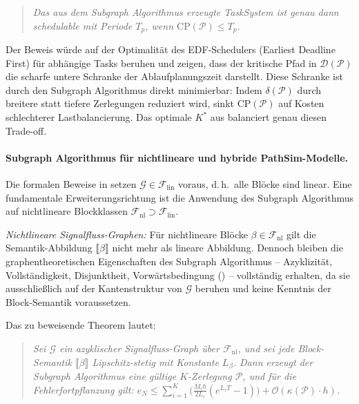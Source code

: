 ﻿\documentclass[12pt,a4paper]{article}
\theoremstyle{definition}
\begin{document}
\begin{quote}
\textit{Das aus dem Subgraph Algorithmus erzeugte TaskSystem ist genau
dann schedulable mit Periode $T_p$, wenn
$\mathrm{CP}(\mathcal{P}) \leq T_p$.}
\end{quote}

Der Beweis würde auf der Optimalität des EDF-Schedulers (Earliest
Deadline First) für abhängige Tasks beruhen und zeigen, dass der
kritische Pfad in $\mathcal{D}(\mathcal{P})$ die scharfe untere
Schranke der Ablaufplanungszeit darstellt. Diese Schranke ist
durch den Subgraph Algorithmus direkt minimierbar: Indem
$\delta(\mathcal{P})$ durch breitere statt tiefere Zerlegungen
reduziert wird, sinkt $\mathrm{CP}(\mathcal{P})$ auf Kosten
schlechterer Lastbalancierung. Das optimale $K^*$ aus
 balanciert genau diesen Trade-off.

\paragraph{Subgraph Algorithmus für nichtlineare und hybride PathSim-Modelle.}
Die formalen Beweise in  setzen
$\mathcal{G} \in \mathcal{F}_{\mathrm{lin}}$ voraus, d.\,h.\ alle Blöcke
sind linear. Eine fundamentale Erweiterungsrichtung ist die Anwendung
des Subgraph Algorithmus auf nichtlineare Blockklassen
$\mathcal{F}_{\mathrm{nl}} \supset \mathcal{F}_{\mathrm{lin}}$.

\emph{Nichtlineare Signalfluss-Graphen:}
Für nichtlineare Blöcke $\beta \in \mathcal{F}_{\mathrm{nl}}$ gilt die
Semantik-Abbildung $\llbracket \beta \rrbracket$ nicht mehr als lineare
Abbildung. Dennoch bleiben die graphentheoretischen Eigenschaften des
Subgraph Algorithmus -- Azyklizität, Vollständigkeit, Disjunktheit,
Vorwärtsbedingung () -- vollständig erhalten, da
sie ausschließlich auf der Kantenstruktur von $\mathcal{G}$ beruhen
und keine Kenntnis der Block-Semantik voraussetzen.

Das zu beweisende Theorem lautet:
\begin{quote}
\textit{Sei $\mathcal{G}$ ein azyklischer Signalfluss-Graph über
$\mathcal{F}_{\mathrm{nl}}$, und sei jede Block-Semantik
$\llbracket\beta\rrbracket$ Lipschitz-stetig mit Konstante $L_\beta$.
Dann erzeugt der Subgraph Algorithmus eine gültige $K$-Zerlegung
$\mathcal{P}$, und für die Fehlerfortpflanzung gilt:
$e_N \leq \sum_{i=1}^K \bigl(\frac{M_i h}{2L_i}(e^{L_i T}-1)\bigr) + \mathcal{O}(\kappa(\mathcal{P}) \cdot h)$.}
\end{quote}
\end{document}
